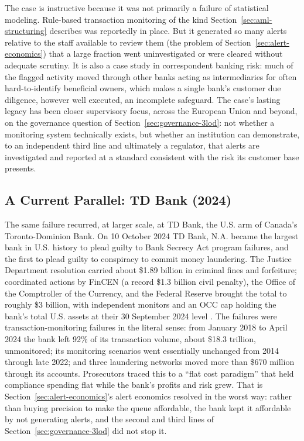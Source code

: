 \documentclass[../ai_in_finance]{subfiles}
\begin{document}
The case is instructive because it was not primarily a failure of statistical modeling. Rule-based transaction monitoring of the kind Section~\ref{sec:aml-structuring} describes was reportedly in place. But it generated so many alerts relative to the staff available to review them (the problem of Section~\ref{sec:alert-economics}) that a large fraction went uninvestigated or were cleared without adequate scrutiny. It is also a case study in correspondent banking risk: much of the flagged activity moved through other banks acting as intermediaries for often hard-to-identify beneficial owners, which makes a single bank's customer due diligence, however well executed, an incomplete safeguard. The case's lasting legacy has been closer supervisory focus, across the European Union and beyond, on the governance question of Section~\ref{sec:governance-3lod}: not whether a monitoring system technically exists, but whether an institution can demonstrate, to an independent third line and ultimately a regulator, that alerts are investigated and reported at a standard consistent with the risk its customer base presents.

\subsection*{A Current Parallel: TD Bank (2024)}

The same failure recurred, at larger scale, at TD Bank, the U.S. arm of Canada's Toronto-Dominion Bank. On 10 October 2024 TD Bank, N.A. became the largest bank in U.S. history to plead guilty to Bank Secrecy Act program failures, and the first to plead guilty to conspiracy to commit money laundering. The Justice Department resolution carried about \$1.89 billion in criminal fines and forfeiture; coordinated actions by FinCEN (a record \$1.3 billion civil penalty), the Office of the Comptroller of the Currency, and the Federal Reserve brought the total to roughly \$3 billion, with independent monitors and an OCC cap holding the bank's total U.S. assets at their 30 September 2024 level \parencite{doj2024tdbank,fincen2024tdbank,occ2024tdbank}. The failures were transaction-monitoring failures in the literal sense: from January 2018 to April 2024 the bank left 92\% of its transaction volume, about \$18.3 trillion, unmonitored; its monitoring scenarios went essentially unchanged from 2014 through late 2022; and three laundering networks moved more than \$670 million through its accounts. Prosecutors traced this to a ``flat cost paradigm'' that held compliance spending flat while the bank's profits and risk grew. That is Section~\ref{sec:alert-economics}'s alert economics resolved in the worst way: rather than buying precision to make the queue affordable, the bank kept it affordable by not generating alerts, and the second and third lines of Section~\ref{sec:governance-3lod} did not stop it.
\end{document}

